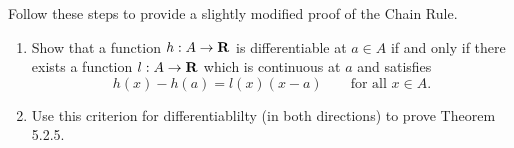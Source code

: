 \documentclass{lew98_solutions}
\begin{document}
\begin{exercise}
\label{ex:5.2.4}
    Follow these steps to provide a slightly modified proof of the Chain Rule.
    \begin{enumerate}
        \item Show that a function \( h : A \to \mathbf{R} \) is differentiable at \( a \in A \) if and only if there exists a function \( l : A \to \mathbf{R} \) which is continuous at \( a \) and satisfies
        \[
            h(x) - h(a) = l(x) (x - a) \qquad \text{for all } x \in A.
        \]

        \item Use this criterion for differentiablilty (in both directions) to prove Theorem 5.2.5.
    \end{enumerate}
\end{exercise}
\end{document}
